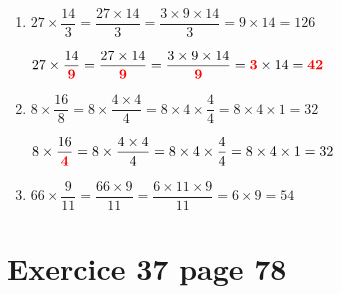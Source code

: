 \documentclass[12pt,a4paper]{article}
\begin{document}
\begin{enumerate}
	\item $27 \times \dfrac{14}{3} = \dfrac{27 \times 14}{3} = \dfrac{3 \times 9 \times 14}{3} = 9 \times 14 = 126$
	
	\vspace*{0.35cm}
	
	$27 \times \dfrac{14}{ \textcolor{red}{\mathbf{9}}} = \dfrac{27 \times 14}{ \textcolor{red}{\mathbf{9}}} = \dfrac{3 \times 9 \times 14}{ \textcolor{red}{\mathbf{9}}} =  \textcolor{red}{\mathbf{3}} \times 14 =  \textcolor{red}{\mathbf{42}}$
	
	\vspace*{0.5cm}
	\item $8 \times \dfrac{16}{8} = 8 \times \dfrac{4 \times 4}{4} = 8 \times 4 \times \dfrac{4}{4} = 8 \times 4 \times 1 = 32$
	
	\vspace*{0.35cm}
	
	$8 \times \dfrac{16}{ \textcolor{red}{\mathbf{4}}} = 8 \times \dfrac{4 \times 4}{4} = 8 \times 4 \times \dfrac{4}{4} = 8 \times 4 \times 1 = 32$
	
	\vspace*{0.5cm}
	\item $66 \times \dfrac{9}{11} = \dfrac{66 \times 9}{11} = \dfrac{6 \times 11 \times 9}{11} = 6 \times 9 = 54$
\end{enumerate}


\section*{Exercice 37 page 78}
\end{document}
